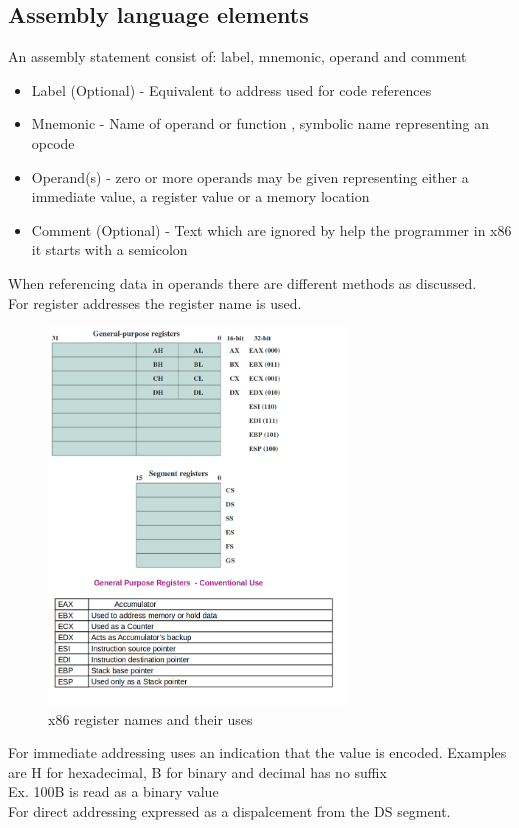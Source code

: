 \documentclass[12pt, a4paper]{article}
\begin{document}
		\subsection{Assembly language elements}
			An assembly statement consist of: label, mnemonic, operand and comment
			\begin{itemize}
				\item Label (Optional) - Equivalent to address used for code references
				\item Mnemonic - Name of operand or function , symbolic name representing an opcode
				\item Operand(s) - zero or more operands may be given representing either a immediate value, a register value or a memory location
				\item Comment (Optional) - Text which are ignored by help the programmer in x86 it starts with a semicolon
			\end{itemize}
			When referencing data in operands there are different methods as discussed. \\
			For register addresses the register name is used.
			\begin{figure}[h!]
				\includegraphics[width=300px]{assets/x86Registers.png}
				\centering
				\caption{x86 register names and their uses}
			\end{figure}
			For immediate addressing uses an indication that the value is encoded. Examples are H for hexadecimal, B for binary and decimal has no suffix\\
			Ex. 100B is read as a binary value\\
			For direct addressing expressed as a dispalcement from the DS segment.\\
\end{document}
